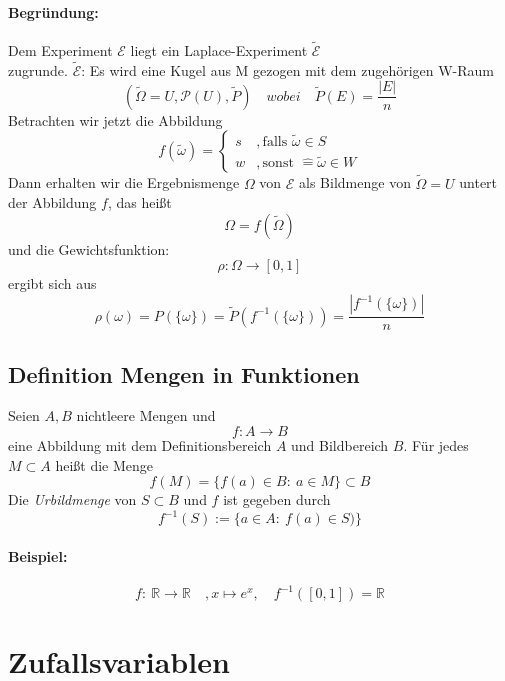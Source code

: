 \documentclass[12pt,a4paper]{article}
\begin{document}
	\paragraph{Begründung: }
	Dem Experiment $\mathcal{E}$ liegt ein Laplace-Experiment $\tilde{\mathcal{E}}$ 
	\\zugrunde. \newline
	$\tilde{\mathcal{E}}$: Es wird eine Kugel aus M gezogen mit dem zugehörigen W-Raum 
	$$(\tilde{\Omega}=U,\mathcal{P}(U),\tilde{P}) \quad wobei \quad \tilde{P}(E) =\frac{|E|}{n}$$
	Betrachten wir jetzt die Abbildung	
	\[
 	f(\tilde{\omega})=\left\{\begin{array}{lr}
 		s &,\text{falls } \tilde{\omega}\in S\\
 		w &,\text{sonst } \widehat{=}\tilde{\omega}\in W
 	\end{array}\right.
 	\]
	Dann erhalten wir die Ergebnismenge $\Omega$ von $\mathcal{E}$ als Bildmenge von $\tilde{\Omega}=U$
	untert der Abbildung $f$, das heißt
	$$\Omega =f(\tilde{\Omega})$$
	und die Gewichtsfunktion:
	$$\rho :\Omega\rightarrow [0,1]$$
	ergibt sich aus
	$$\rho(\omega)=P(\{\omega\})=\tilde{P}(f^{-1}(\{\omega\}))=\frac{|f^{-1}(\{\omega\})|}{n}$$
	\subsection{Definition Mengen in Funktionen}
	Seien $A,B$ nichtleere Mengen und
	$$f: A \rightarrow B$$
	eine Abbildung mit dem Definitionsbereich $A$ und Bildbereich $B$. Für jedes $M\subset A$ heißt die Menge
	$$f(M)=\{f(a)\in B: \: a\in M\}\subset B$$
	Die \textit{Urbildmenge} von $S\subset B$  und $f$ ist gegeben durch
	$$f^{-1}(S):=\{a\in A: \: f(a)\in S)\}$$
	\paragraph{Beispiel: }
	$$f:\: \mathbb{R}\rightarrow\mathbb{R}\quad , x\longmapsto e^x,\quad f^{-1}([0,1])=\mathbb{R}$$ 
	 \section{Zufallsvariablen}
\end{document}
